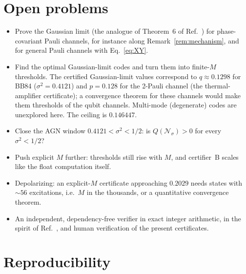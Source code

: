\documentclass[aps,pra,reprint,superscriptaddress,nofootinbib,longbibliography,floatfix]{revtex4-2}
\theoremstyle{remark}
\newcommand{\Nsig}{\mathcal{N}_\sigma}
\begin{document}
\section{Open problems}
\label{sec:open}
\begin{itemize}
\item Prove the Gaussian limit (the analogue of Theorem~6 of Ref.~\cite{ahmed2026choir}) for
phase-covariant Pauli channels, for instance along Remark~\ref{rem:mechanism}, and for general Pauli
channels with Eq.~\eqref{eq:XY}.
\item Find the optimal Gaussian-limit codes and turn them into finite-$M$ thresholds. The certified Gaussian-limit
values correspond to $q\approx0.1298$ for BB84 ($\sigma^2=0.4121$) and $p=0.128$ for the 2-Pauli channel (the
thermal-amplifier certificate); a convergence theorem for these channels would make them thresholds of the
qubit channels. Multi-mode (degenerate) codes are unexplored here. The ceiling is $0.146447$.
\item Close the AGN window $0.4121<\sigma^2<1/2$: is $Q(\Nsig)>0$ for every $\sigma^2<1/2$?
\item Push explicit $M$ further: thresholds still rise with $M$, and certifier~B scales like the float
computation itself.
\item Depolarizing: an explicit-$M$ certificate approaching $0.2029$ needs states with $\sim56$
excitations, i.e.\ $M$ in the thousands, or a quantitative convergence theorem.
\item An independent, dependency-free verifier in exact integer arithmetic, in the spirit of
Ref.~\cite{krohn2026certified}, and human verification of the present certificates.
\end{itemize}

\section{Reproducibility}
\label{sec:repro}
\end{document}
